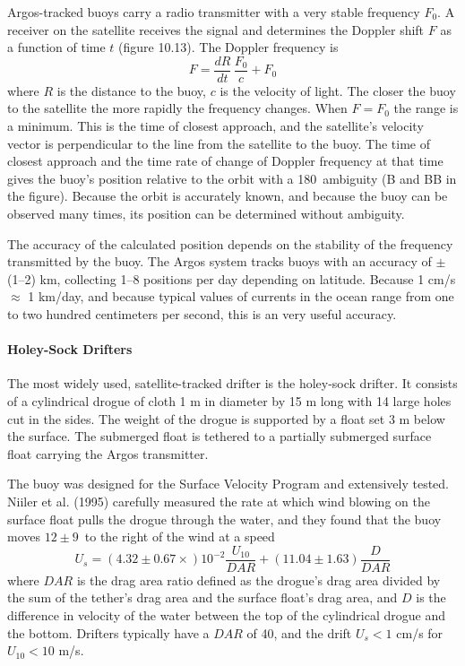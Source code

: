 Argos-tracked buoys carry a radio transmitter with a very stable frequency $F_0$. A receiver on the
satellite receives the signal and determines the Doppler shift $F$ as a function of time $t$
(figure 10.13). The Doppler frequency is
\begin{displaymath}
F=\frac{dR}{dt}\,\frac{F_0}{c} + F_0
\end{displaymath}
where $R$ is the distance to the buoy, $c$ is the velocity of light. The closer the buoy to the satellite the more rapidly the frequency changes. When $F = F_0$ the range is a minimum. This is the time of closest approach, and the satellite's velocity vector is perpendicular to the line from the satellite to the buoy. The time of closest approach and the time rate of change of Doppler frequency at that time gives the buoy's position relative to the orbit with a 180\degrees\  ambiguity (B and BB in the figure). Because the orbit is accurately known, and because the buoy can be observed many times, its position can be determined without ambiguity.

The accuracy of the calculated position depends on the stability of the
frequency transmitted by the buoy. The Argos system tracks buoys with an
accuracy of $\pm$(1--2) km, collecting 1--8
positions per day depending on latitude. Because 1 cm/s $\approx$ 1 km/day, and because
typical values of currents in the ocean range from one to two hundred centimeters per second,
this is an very useful accuracy.

\paragraph{Holey-Sock Drifters}
The most widely used, satellite-tracked drifter is the holey-sock drifter. It consists of a cylindrical drogue of cloth 1 m in diameter by 15 m long with 14 large holes cut in the sides. The weight of the drogue is supported by a float set 3 m below the surface. The submerged float is tethered to a partially submerged surface float carrying the Argos transmitter.

The buoy was designed for the Surface Velocity Program and extensively tested. Niiler et al. (1995) carefully measured the rate at which wind blowing on the
surface float pulls the drogue through the water, and they found that the
buoy moves $12\pm9$\degrees\  to the right of the wind at a speed
\begin{equation}
U_s = \left( 4.32\pm 0.67 \times\right) 10^{-2} \frac{U_{10}}{DAR} +
\left( 11.04\pm 1.63 \right) \frac{D}{DAR}
\end{equation}
where $DAR$ is the drag area ratio defined as the drogue's drag area divided by
the sum of the tether's drag area and the surface float's drag area, and $D$ is
the difference in velocity of the water between the top of the cylindrical drogue
and the bottom. Drifters typically have a $DAR$ of 40, and the drift $U_s < 1$ cm/s for $U_{10} < 10$
m/s.

